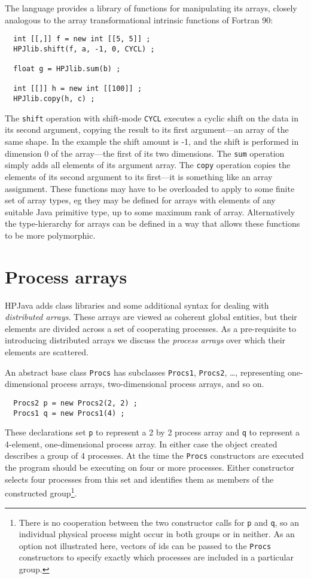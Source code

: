 The language provides a library of functions for manipulating its
arrays, closely analogous to the array transformational intrinsic
functions of Fortran 90:
\small
\begin{verbatim}
  int [[,]] f = new int [[5, 5]] ;
  HPJlib.shift(f, a, -1, 0, CYCL) ;

  float g = HPJlib.sum(b) ;

  int [[]] h = new int [[100]] ;
  HPJlib.copy(h, c) ;
\end{verbatim}
\normalsize
The {\tt shift} operation with shift-mode {\tt CYCL} executes a cyclic
shift on the data in its second argument, copying the result to its
first argument---an array of the same shape.  In the example
the shift amount is -1, and the shift is performed in dimension 0 of
the array---the first of its two dimensions.  The {\tt sum} operation
simply adds all elements of its argument array.  The {\tt copy} operation
copies the elements of its second argument to its first---it is something
like an array assignment.  These functions may have to be overloaded
to apply to some finite set of array types, eg they may be defined for
arrays with elements of any suitable Java primitive type, up to some maximum
rank of array.  Alternatively the type-hierarchy for arrays can be defined
in a way that allows these functions to be more polymorphic.

\section{Process arrays\label{procArrays}}

HPJava adds class libraries and some additional syntax for dealing
with {\em distributed arrays}.  These arrays are viewed as
coherent global entities, but their elements are divided
across a set of cooperating processes.  As a pre-requisite to
introducing distributed arrays we discuss the {\em process arrays} over
which their elements are scattered.

An abstract base class {\tt Procs}
has subclasses {\tt Procs1}, {\tt Procs2}, \ldots, representing
one-dimensional process arrays, two-dimensional process arrays, 
and so on.
\small
\begin{verbatim}
  Procs2 p = new Procs2(2, 2) ;
  Procs1 q = new Procs1(4) ;
\end{verbatim}
\normalsize
These declarations set {\tt p} to represent a 2 by 2 process array and {\tt q}
to represent a 4-element, one-dimensional process array.  In either case
the object created describes a group of 4 processes.
At the time the {\tt Procs} constructors are executed the program should be
executing on four or more processes.  Either constructor selects four
processes from this set and identifies them as members of
the constructed group\footnote{There is no cooperation between
the two constructor calls for {\tt p} and {\tt q}, so an individual
physical process might occur in both groups or in
neither.  As an option not illustrated here, vectors of
ids can be passed to the {\tt Procs} constructors to specify
exactly which processes are included in a particular group.}.

